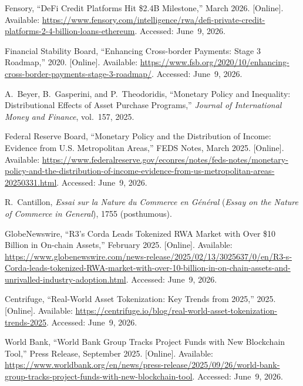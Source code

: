 \documentclass[12pt, a4paper]{report}
\begin{document}
{\begin{enumerate}[label={[\arabic*]}]
\item Fensory, ``DeFi Credit Platforms Hit \$2.4B Milestone,'' March 2026. [Online]. Available: \url{https://www.fensory.com/intelligence/rwa/defi-private-credit-platforms-2-4-billion-loans-ethereum}. Accessed: June~9, 2026.

\item Financial Stability Board, ``Enhancing Cross-border Payments: Stage 3 Roadmap,'' 2020. [Online]. Available: \url{https://www.fsb.org/2020/10/enhancing-cross-border-payments-stage-3-roadmap/}. Accessed: June~9, 2026.

\item A.~Beyer, B.~Gasperini, and P.~Theodoridis, ``Monetary Policy and Inequality: Distributional Effects of Asset Purchase Programs,'' \textit{Journal of International Money and Finance}, vol.~157, 2025.

\item Federal Reserve Board, ``Monetary Policy and the Distribution of Income: Evidence from U.S. Metropolitan Areas,'' FEDS Notes, March 2025. [Online]. Available: \url{https://www.federalreserve.gov/econres/notes/feds-notes/monetary-policy-and-the-distribution-of-income-evidence-from-us-metropolitan-areas-20250331.html}. Accessed: June~9, 2026.

\item R.~Cantillon, \textit{Essai sur la Nature du Commerce en G\'en\'eral} (\textit{Essay on the Nature of Commerce in General}), 1755 (posthumous).

\item GlobeNewswire, ``R3's Corda Leads Tokenized RWA Market with Over \$10 Billion in On-chain Assets,'' February 2025. [Online]. Available: \url{https://www.globenewswire.com/news-release/2025/02/13/3025637/0/en/R3-s-Corda-leads-tokenized-RWA-market-with-over-10-billion-in-on-chain-assets-and-unrivalled-industry-adoption.html}. Accessed: June~9, 2026.

\item Centrifuge, ``Real-World Asset Tokenization: Key Trends from 2025,'' 2025. [Online]. Available: \url{https://centrifuge.io/blog/real-world-asset-tokenization-trends-2025}. Accessed: June~9, 2026.

\item World Bank, ``World Bank Group Tracks Project Funds with New Blockchain Tool,'' Press Release, September 2025. [Online]. Available: \url{https://www.worldbank.org/en/news/press-release/2025/09/26/world-bank-group-tracks-project-funds-with-new-blockchain-tool}. Accessed: June~9, 2026.


\end{enumerate}}
\end{document}
